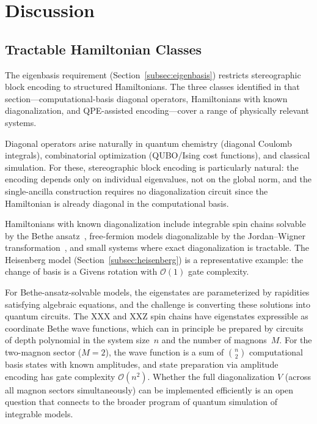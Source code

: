 \section{Discussion}
\label{sec:discussion}

\subsection{Tractable Hamiltonian Classes}
\label{subsec:tractable}

The eigenbasis requirement
(Section~\ref{subsec:eigenbasis}) restricts stereographic block
encoding to structured Hamiltonians.  The three classes identified
in that section---computational-basis diagonal operators,
Hamiltonians with known diagonalization, and QPE-assisted
encoding---cover a range of physically relevant systems.

Diagonal operators arise naturally in quantum chemistry
(diagonal Coulomb integrals), combinatorial optimization
(QUBO/Ising cost functions), and classical simulation.  For
these, stereographic block encoding is particularly natural:
the encoding depends only on individual eigenvalues, not on the
global norm, and the single-ancilla construction requires no
diagonalization circuit since the Hamiltonian is already diagonal
in the computational basis.

Hamiltonians with known diagonalization include integrable spin
chains solvable by the Bethe ansatz~\cite{Bethe1931}, free-fermion
models diagonalizable by the Jordan--Wigner
transformation~\cite{JordanWigner1928}, and small systems where
exact diagonalization is tractable.  The Heisenberg model
(Section~\ref{subsec:heisenberg}) is a representative example:
the change of basis is a Givens rotation with $\mathcal{O}(1)$
gate complexity.

For Bethe-ansatz-solvable models, the eigenstates are
parameterized by rapidities satisfying algebraic equations,
and the challenge is converting these solutions into
quantum circuits.  The XXX and XXZ spin chains have
eigenstates expressible as coordinate Bethe wave functions,
which can in principle be prepared by circuits of depth
polynomial in the system size~$n$ and the number of
magnons~$M$.  For the two-magnon sector ($M=2$), the
wave function is a sum of $\binom{n}{2}$ computational
basis states with known amplitudes, and state preparation
via amplitude encoding has gate complexity
$\mathcal{O}(n^2)$.  Whether the full diagonalization
$V$ (across all magnon sectors simultaneously) can be
implemented efficiently is an open question that connects
to the broader program of quantum simulation of integrable
models.

